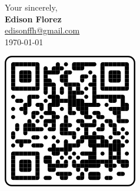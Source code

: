 \vfill
\begin{minipage}[c]{.75\textwidth}
    Your sincerely,\\[5mm]
    \textbf{Edison Florez}\\
    \underline{edisonffh@gmail.com}\\
    \today
\end{minipage}
\begin{minipage}[c]{.2\textwidth}
    \centering
    \href{
        https://github.com/e-florez/e-florez
    }{
        \includegraphics[scale=0.4]{figs/qrcode_github_page.png}
    }
\end{minipage}
